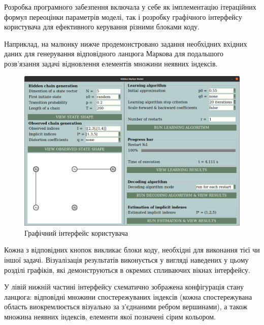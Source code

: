 \label{appendix: A}

Розробка програмного забезпення включала у себе як імплементацію ітераційних формул переоцінки параметрів моделі, так і розробку графічного інтерфейсу користувача для ефективного керування різними блоками коду. 

Наприклад, на малюнку нижче продемонстровано задання необхідних вхідних даних для генерування відповідного ланцюга Маркова для подальшого розв'язання задачі відновлення елементів множини неявних індексів.

\begin{figure}[H]\centering
    \includegraphics[width=1\linewidth]{Images/GUI.png}
    \caption{Графічний інтерфейс користувача}
    \label{pic: GUI}
\end{figure}

Кожна з відповідних кнопок викликає блоки коду, необхідні для виконання тієї чи іншої задачі. Візуалізація результатів виконується у вигляді наведених у цьому розділі графіків, які демонструються в окремих спливаючих вікнах інтерфейсу.

У лівій нижній частині інтерфейсу схематично зображена конфігурація стану ланцюга: відповідні множини спостережуваних індексів (кожна спостережувана область виокремлюється візуально за з'єднаними ребром вершинами), а також множина неявних індексів, елементи якої позначені сірим кольором.